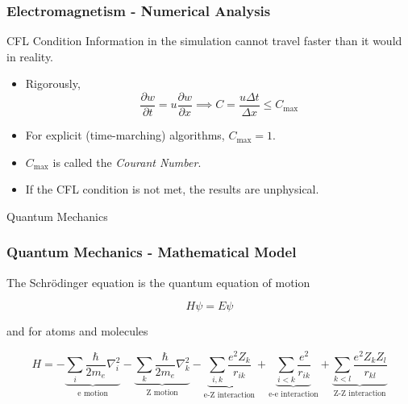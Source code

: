 \documentclass{beamer}
\begin{document}
\begin{frame}
    \frametitle{Electromagnetism - Numerical Analysis}

    \begin{block}{CFL Condition}
        Information in the simulation cannot travel faster than it would in reality.
    \end{block}

    \begin{itemize}
        \item Rigorously, 
        \begin{equation}
            \frac{\partial w}{\partial t} = u \frac{\partial w}{\partial x} \implies C = \frac{u \Delta t}{\Delta x} \leq C_\text{max}
        \end{equation}
        \item For explicit (time-marching) algorithms, $C_\text{max} = 1$.
        \item $C_\text{max}$ is called the \textit{Courant Number}.
        \item If the CFL condition is not met, the results are unphysical.
    \end{itemize}

\end{frame}

\begin{frame}

    \begin{block}{}
        \centering \Large Quantum Mechanics
    \end{block}

\end{frame}

\begin{frame}
    \frametitle{Quantum Mechanics - Mathematical Model}

    The Schr{\"o}dinger equation is the quantum equation of motion
    
    \begin{equation}
        H \psi = E \psi
    \end{equation}

    and for atoms and molecules

    \small \begin{equation}
        H = -\underbrace{\sum_i \frac{\hbar}{2 m_e} \nabla_i^2}_{\text{e motion}} - \underbrace{\sum_k \frac{\hbar}{2 m_e} \nabla_k^2}_{\text{Z motion}} - \underbrace{\sum_{i,k} \frac{e^2 Z_k}{r_{ik}}}_{\text{e-Z interaction}} + \underbrace{\sum_{i < k} \frac{e^2}{r_{ik}}}_{\text{e-e interaction}} + \underbrace{\sum_{k < l} \frac{e^2 Z_k Z_l}{r_{kl}}}_{\text{Z-Z interaction}}
    \end{equation}

\end{frame}
\end{document}
